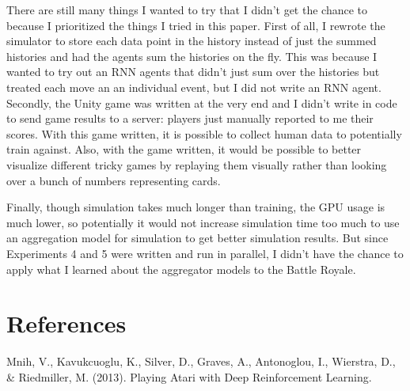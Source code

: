 \documentclass{article}
\begin{document}
There are still many things I wanted to try that I didn't get the chance to because I prioritized the things I tried in this paper. First of all, I rewrote the simulator to store each data point in the history instead of just the summed histories and had the agents sum the histories on the fly. This was because I wanted to try out an RNN agents that didn't just sum over the histories but treated each move an an individual event, but I did not write an RNN agent. Secondly, the Unity game was written at the very end and I didn't write in code to send game results to a server: players just manually reported to me their scores. With this game written, it is possible to collect human data to potentially train against. Also, with the game written, it would be possible to better visualize different tricky games by replaying them visually rather than looking over a bunch of numbers representing cards. 

Finally, though simulation takes much longer than training, the GPU usage is much lower, so potentially it would not increase simulation time too much to use an aggregation model for simulation to get better simulation results. But since Experiments 4 and 5 were written and run in parallel, I didn't have the chance to apply what I learned about the aggregator models to the Battle Royale.

\section{References}
Mnih, V., Kavukcuoglu, K., Silver, D., Graves, A., Antonoglou, I., Wierstra, D., \& Riedmiller, M. (2013). Playing Atari with Deep Reinforcement Learning. 
\end{document}
